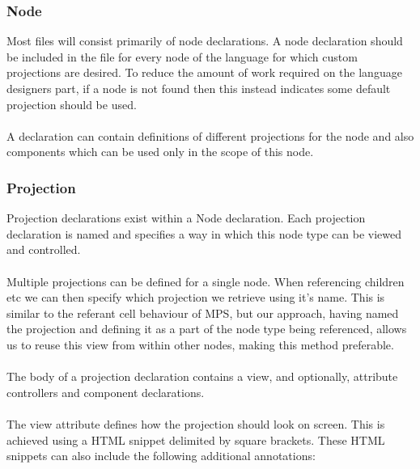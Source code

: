 \documentclass{article}
\begin{document}
\subsubsection{Node}

Most files will consist primarily of node declarations. A node declaration should be included in the file for every node of the language for which custom projections are desired. To reduce the amount of work required on the language designers part, if a node is not found then this instead indicates some default projection should be used.  
\\
\\
A declaration can contain definitions of different projections for the node and also components which can be used only in the scope of this node.

\subsubsection{Projection}
Projection declarations exist within a Node declaration. Each projection declaration is named and specifies a way in which this node type can be viewed and controlled.
\\
\\
Multiple projections can be defined for a single node. When referencing children etc we can then specify which projection we retrieve using it's name. This is similar to the referant cell behaviour of MPS, but our approach, having named the projection and defining it as a part of the node type being referenced, allows us to reuse this view from within other nodes, making this method preferable.
\\
\\
The body of a projection declaration contains a view, and optionally, attribute controllers and component declarations.
\\
\\
The view attribute defines how the projection should look on screen. This is achieved using a HTML snippet delimited by square brackets.  These HTML snippets can also include the following additional annotations:
\end{document}
